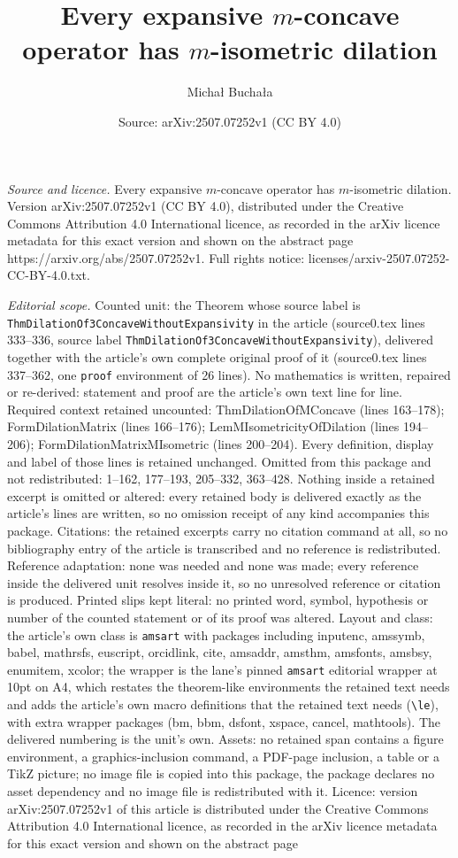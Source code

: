 \documentclass[10pt,a4paper]{amsart}
\title[Every expansive $ m $-concave operator has $ m $-isometric d]{Every expansive $ m $-concave operator has $ m $-isometric dilation}
\author{Micha{\l} Bucha{\l}a}
\date{Source: arXiv:2507.07252v1 (CC BY 4.0)}
\begin{document}
\maketitle

\noindent\emph{Source and licence.} Every expansive $ m $-concave operator has $ m $-isometric dilation. Version arXiv:2507.07252v1 (CC BY 4.0), distributed under the Creative Commons Attribution 4.0 International licence, as recorded in the arXiv licence metadata for this exact version and shown on the abstract page https://arxiv.org/abs/2507.07252v1. Full rights notice: licenses/arxiv-2507.07252-CC-BY-4.0.txt.\par\smallskip

\noindent\textit{Editorial scope.} Counted unit: the Theorem whose source label is \texttt{ThmDilationOf3ConcaveWithoutExpansivity} in the article (source0.tex lines 333--336, source label \texttt{ThmDilationOf3ConcaveWithoutExpansivity}), delivered together with the article's own complete original proof of it (source0.tex lines 337--362, one \texttt{proof} environment of 26 lines). No mathematics is written, repaired or re-derived: statement and proof are the article's own text line for line. Required context retained uncounted: ThmDilationOfMConcave (lines 163--178); FormDilationMatrix (lines 166--176); LemMIsometricityOfDilation (lines 194--206); FormDilationMatrixMIsometric (lines 200--204). Every definition, display and label of those lines is retained unchanged. Omitted from this package and not redistributed: 1--162, 177--193, 205--332, 363--428. Nothing inside a retained excerpt is omitted or altered: every retained body is delivered exactly as the article's lines are written, so no omission receipt of any kind accompanies this package. Citations: the retained excerpts carry no citation command at all, so no bibliography entry of the article is transcribed and no reference is redistributed. Reference adaptation: none was needed and none was made; every reference inside the delivered unit resolves inside it, so no unresolved reference or citation is produced. Printed slips kept literal: no printed word, symbol, hypothesis or number of the counted statement or of its proof was altered. Layout and class: the article's own class is \texttt{amsart} with packages including inputenc, amssymb, babel, mathrsfs, euscript, orcidlink, cite, amsaddr, amsthm, amsfonts, amsbsy, enumitem, xcolor; the wrapper is the lane's pinned \texttt{amsart} editorial wrapper at 10pt on A4, which restates the theorem-like environments the retained text needs and adds the article's own macro definitions that the retained text needs (\texttt{\textbackslash le}), with extra wrapper packages (bm, bbm, dsfont, xspace, cancel, mathtools). The delivered numbering is the unit's own. Assets: no retained span contains a figure environment, a graphics-inclusion command, a PDF-page inclusion, a table or a TikZ picture; no image file is copied into this package, the package declares no asset dependency and no image file is redistributed with it. Licence: version arXiv:2507.07252v1 of this article is distributed under the Creative Commons Attribution 4.0 International licence, as recorded in the arXiv licence metadata for this exact version and shown on the abstract page 
\end{document}
